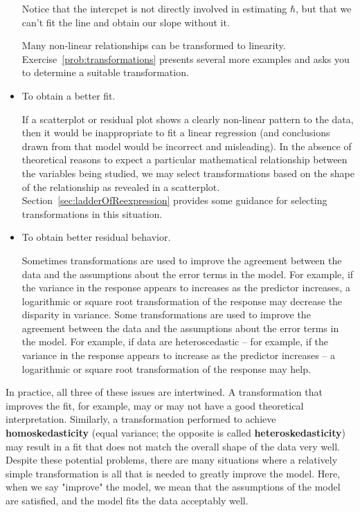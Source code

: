 \documentclass[twoside]{book}\usepackage[]{graphicx}\usepackage[]{xcolor}
\def\myindex#1{\index{#1}}
\def\term#1{\textbf{#1}}
\newcounter{example}[section]
\begin{document}
\begin{itemize}
Notice that the intercpet is not directly involved in estimating $\hbar$, but that we can't fit
the line and obtain our slope without it.
	
	Many non-linear relationships can be transformed to linearity.  
	Exercise~\ref{prob:transformations} presents several more examples
	and asks you to determine a suitable transformation.

  \item To obtain a better fit.

	If a scatterplot or residual plot shows a clearly non-linear pattern 
	to the data, then it would be inappropriate to fit a linear regression (and conclusions drawn from that model would be incorrect and misleading).  
	In the absence of theoretical reasons to expect a particular mathematical relationship between the variables being studied, we may select 
	transformations based on the shape of the relationship as 
	revealed in a scatterplot.  Section~\ref{sec:ladderOfReexpression}
	provides some guidance for selecting transformations in
	this situation.

  \item To obtain better residual behavior.

	Sometimes transformations are used to improve the agreement between the
	data and the assumptions about the error terms in the model.  For example,
	if the variance in the response appears to increases as the predictor 
	increases, a logarithmic or square root transformation of the response may 
	decrease the disparity in variance.  
	Some transformations are used to improve the agreement between the
	data and the assumptions about the error terms in the model. 
	For example, if data are heteroscedastic -- for example, 
	if the variance in the response appears to increase as the predictor increases -- 
	a logarithmic or square root transformation of the response may help.  
\end{itemize}

In practice, all three of these issues are intertwined.  A transformation that
improves the fit, for example, may or may not have a good theoretical 
interpretation.  
Similarly, a transformation performed to achieve \term{homoskedasticity} 
\myindex{heteroskedasticity}%
\myindex{homoskedasticity}%
(equal variance; the opposite is called \term{heteroskedasticity}) 
may result in a fit that does not match the overall shape of the data very well.
Despite these potential problems, there are many situations where a relatively
simple transformation is all that is needed to greatly improve the model.  Here, when we say "improve" the model, we mean that the assumptions of the model are satisfied, and the model fits the data acceptably well.
\end{document}
